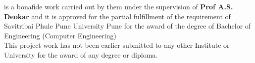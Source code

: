 \noindent
is a bonafide work carried out by them under the supervision of \textbf{Prof A.S. Deokar} and it is approved for the partial fulfillment of the requirement of Savitribai Phule Pune University Pune for the award of the degree of Bachelor of Engineering (Computer Engineering) \\

\noindent
This project work has not been earlier submitted to any other Institute or University for the award of any degree or diploma.
